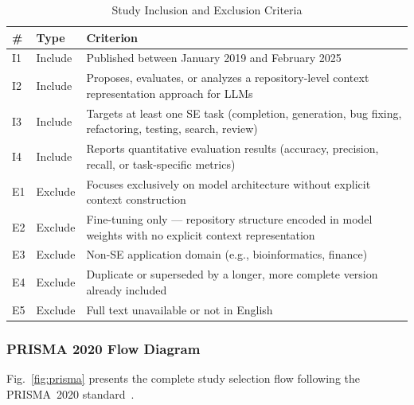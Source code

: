 \begin{table}[htbp]
\renewcommand{\arraystretch}{1.3}
\caption{Study Inclusion and Exclusion Criteria}
\label{tab:criteria}
\centering
\begin{tabular}{C{0.4cm}L{1.0cm}L{5.5cm}}
\toprule
\textbf{\#} & \textbf{Type} & \textbf{Criterion} \\
\midrule
I1 & Include & Published between January 2019 and February 2025 \\
I2 & Include & Proposes, evaluates, or analyzes a repository-level context representation approach for LLMs \\
I3 & Include & Targets at least one SE task (completion, generation, bug fixing, refactoring, testing, search, review) \\
I4 & Include & Reports quantitative evaluation results (accuracy, precision, recall, or task-specific metrics) \\
\addlinespace
E1 & Exclude & Focuses exclusively on model architecture without explicit context construction \\
E2 & Exclude & Fine-tuning only --- repository structure encoded in model weights with no explicit context representation \\
E3 & Exclude & Non-SE application domain (e.g., bioinformatics, finance) \\
E4 & Exclude & Duplicate or superseded by a longer, more complete version already included \\
E5 & Exclude & Full text unavailable or not in English \\
\bottomrule
\end{tabular}
\end{table}

\subsubsection{PRISMA 2020 Flow Diagram}

Fig.~\ref{fig:prisma} presents the complete study selection flow following the
PRISMA~2020 standard~\cite{prisma2020}.


